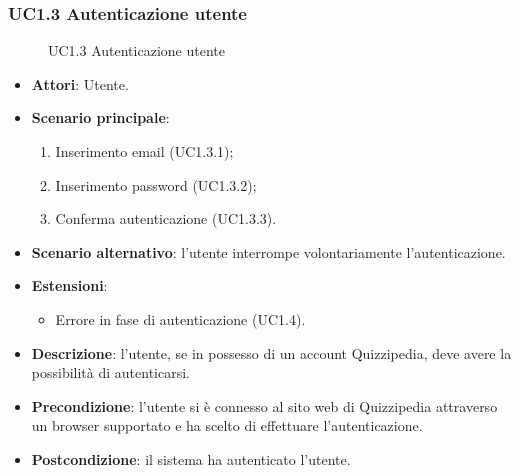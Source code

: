 \subsubsection{UC1.3 Autenticazione utente}
\begin{figure}[H]
\centering
\noindent{}
\caption{UC1.3 Autenticazione utente}
\end{figure}
\begin{itemize}
\item \textbf{Attori}: Utente.
\item \textbf{Scenario principale}:
\begin{enumerate}
\item Inserimento email (UC1.3.1);
\item Inserimento password (UC1.3.2);
\item Conferma autenticazione (UC1.3.3).
\end{enumerate}
\item \textbf{Scenario alternativo}: l'utente interrompe volontariamente l'autenticazione.
\item \textbf{Estensioni}:
\begin{itemize}
\item Errore in fase di autenticazione (UC1.4).
\end{itemize}
\item \textbf{Descrizione}: l'utente, se in possesso di un account Quizzipedia, deve avere la possibilità di autenticarsi.
\item \textbf{Precondizione}: l'utente si è connesso al sito web di Quizzipedia attraverso un browser supportato e ha scelto di effettuare l'autenticazione.
\item \textbf{Postcondizione}: il sistema ha autenticato l'utente.
\end{itemize}
